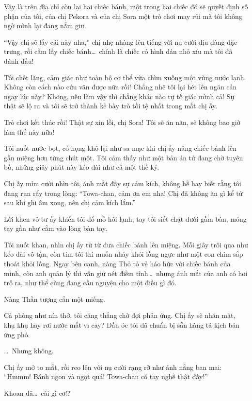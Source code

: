 \documentclass[../main.tex]{subfiles}
\begin{document}
Vậy là trên đĩa chỉ còn lại hai chiếc bánh, một trong hai chiếc đó sẽ quyết định số phận của tôi, của chị Pekora và của chị Sora một trò chơi may rủi mà tôi không ngờ mình lại đang nắm giữ.

``Vậy chị sẽ lấy cái này nha,'' chị nhẹ nhàng lên tiếng với nụ cười dịu dàng đặc trưng, rồi cầm lấy chiếc bánh\dots\ chính là chiếc có hình dán nhỏ xíu mà tôi đã đánh dấu!

Tôi chết lặng, cảm giác như toàn bộ cơ thể vừa chìm xuống một vùng nước lạnh. Không còn cách nào cứu vãn được nữa rồi! Chẳng nhẽ tôi lại hét lên ngăn cản ngay lúc này? Không, nếu làm vậy thì chẳng khác nào tự tố giác mình cả! Sự thật sẽ lộ ra và tôi sẽ trở thành kẻ bày trò tồi tệ nhất trong mắt chị ấy.

Trò chơi kết thúc rồi! Thật sự xin lỗi, chị Sora! Tôi sẽ ăn năn, sẽ không bao giờ làm thế này nữa!

Tôi nuốt nước bọt, cổ họng khô lại như sa mạc khi chị ấy nâng chiếc bánh lên gần miệng hơn từng chút một. Tôi cảm thấy như một bản án tử đang chờ tuyên bố, những giây phút này kéo dài như cả một thế kỷ.

Chị ấy mỉm cười nhìn tôi, ánh mắt đầy sự cảm kích, không hề hay biết rằng tôi đang run rẩy trong lòng: ``Towa-chan, cảm ơn em nha! Chị đã không ăn gì kể từ sau khi ghi âm xong, nên chị cảm kích lắm.''

Lời khen vô tư ấy khiến tôi đổ mồ hôi lạnh, tay tôi siết chặt dưới gầm bàn, móng tay gần như cắm vào lòng bàn tay.


Tôi nuốt khan, nhìn chị ấy từ từ đưa chiếc bánh lên miệng. Mỗi giây trôi qua như kéo dài vô tận, còn tim tôi thì muốn nhảy khỏi lồng ngực như một con chim sắp thoát khỏi lồng. Ngay bên cạnh, nàng Thỏ tỏ vẻ háo hức với chiếc bánh của mình, còn anh quản lý thì vẫn giữ nét điềm tĩnh\dots\ nhưng ánh mắt của anh có hơi trố ra, như thể cũng đang cầu nguyện cho một điều gì đó.

Nàng Thần tượng cắn một miếng.

Cả phòng như nín thở, tôi căng thẳng chờ đợi phản ứng. Chị ấy sẽ nhăn mặt, khụ khụ hay rơi nước mắt vì cay? Đầu óc tôi đã chuẩn bị sẵn hàng tá kịch bản ứng phó.

\dots\ Nhưng không.

Chị ấy mở to mắt, rồi reo lên với nụ cười rạng rỡ như ánh nắng ban mai: ``Hmmm! Bánh ngon và ngọt quá! Towa-chan có tay nghề thật đấy!''

Khoan đã\dots\ cái gì cơ!?
\end{document}
